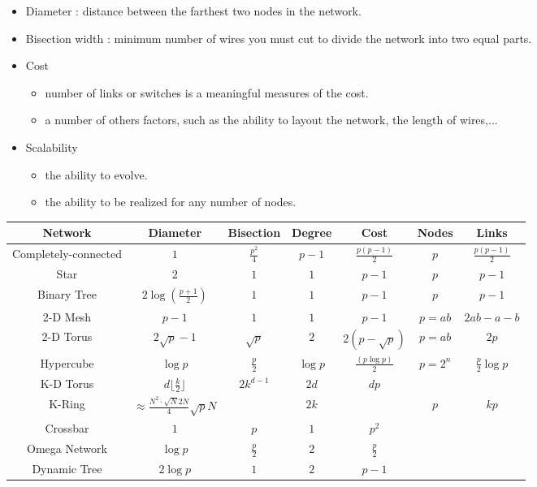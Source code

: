 \documentclass[11pt,a4paper]{report}
\begin{document}
\begin{itemize}
    \item Diameter : distance between the farthest two nodes in the network.
    \item Bisection width : minimum number of wires you must cut to divide the network into two equal parts.
    \item Cost
        \begin{itemize}
            \item number of links or switches is a meaningful measures of the cost.
            \item a number of others factors, such as the ability to layout the network, the length of wires,...
        \end{itemize}
    \item Scalability
        \begin{itemize}
            \item the ability to evolve.
            \item the ability to be realized for any number of nodes.
        \end{itemize}
\end{itemize}

\begin{table}[h]
\centering
\begin{tabular}{|ccccccc|}
    \hline
    Network & Diameter & Bisection & Degree & Cost & Nodes & Links \\\hline
    Completely-connected & $1$ & $\frac{p^2}{4}$ & $p-1$ & $\frac{p(p-1)}{2}$ & $p$ & $\frac{p(p-1)}{2}$ \\
    Star & $2$ & $1$ & $1$ & $p-1$ & $p$ & $p - 1$ \\
    Binary Tree & $2\log(\frac{p+1}{2})$ & $1$ & $1$ & $p-1$ & $p$ & $p-1$ \\
    2-D Mesh & $p-1$ & $1$ & $1$ & $p-1$ & $p=ab$ & $2ab-a-b$ \\ 
    2-D Torus & $2\sqrt{p}-1$ & $\sqrt{p}$ & $2$ & $2(p-\sqrt{p})$ & $p=ab$ & $2p$ \\
    Hypercube & $\log p$ & $\frac{p}{2}$ & $\log p$ & $\frac{(p \log p)}{2}$ & $p=2^n$ & $\frac{p}{2}\log p$ \\
    K-D Torus & $d\lfloor\frac{k}{2}\rfloor$ & $2k^{d-1}$ & $2d$ & $dp$ & & \\
    K-Ring & $\approx \frac{N^2 \cdot \sqrt{N}{2N}}{4} \sqrt{p}{N}$ & & $2k$ & & $p$ & $kp$ \\
    Crossbar & $1$ & $p$ & $1$ & $p^2$ & & \\
    Omega Network & $\log p$ & $\frac{p}{2}$ & $2$ & $\frac{p}{2}$ & & \\
    Dynamic Tree & $2\log p$ & $1$ & $2$ & $p-1$ & &\\
    \hline
\end{tabular}
\end{table}
\end{document}
